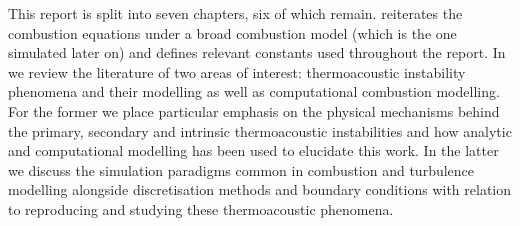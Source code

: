 This report is split into seven chapters, six of which remain.  reiterates the combustion equations under a broad combustion model (which is the one simulated later on) and defines relevant constants used throughout the report. In  we review the literature of two areas of interest: thermoacoustic instability phenomena and their modelling as well as computational combustion modelling. For the former we place particular emphasis on the physical mechanisms behind the primary, secondary and intrinsic thermoacoustic instabilities and how analytic and computational modelling has been used to elucidate this work. In the latter we discuss the simulation paradigms common in combustion and turbulence modelling alongside discretisation methods and boundary conditions with relation to reproducing and studying these thermoacoustic phenomena.






